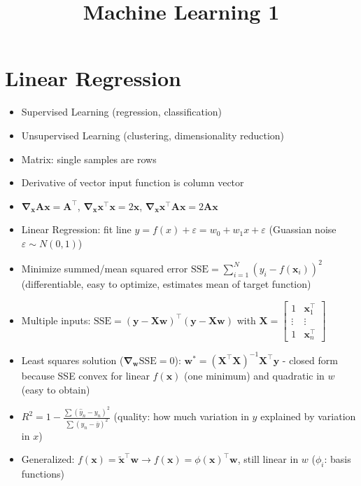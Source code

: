 \documentclass[11pt]{scrartcl}
\title{Machine Learning 1}
\date{\vspace{-5ex}}
\begin{document}
\maketitle

\section{Linear Regression}

\begin{itemize}
    \item Supervised Learning (regression, classification)
    \item Unsupervised Learning (clustering, dimensionality reduction)
    \item Matrix: single samples are rows
    \item Derivative of vector input function is column vector
    \item \(\bm{\nabla_x} \bm{Ax} = \bm{A}^\top\), \(\bm{\nabla_x} \bm{x}^\top \bm{x} = 2 
        \bm{x}\), \(\bm{\nabla_x} \bm{x}^\top \bm{A} \bm{x} = 2 \bm{Ax}\)
    \item Linear Regression: fit line \(y = f(x) + \varepsilon = w_0 + w_1 x + \varepsilon\) 
        (Guassian noise \(\varepsilon \sim N(0, 1)\))
    \item Minimize summed/mean squared error \(\mathrm{SSE} = 
        \sum_{i = 1}^N (y_i - f(\bm{x}_i))^2\) (differentiable, easy to optimize, 
        estimates mean of target function)
    \item Multiple inputs: \(\mathrm{SSE} = (\bm{y} - \bm{Xw})^\top (\bm{y} - \bm{Xw})\) 
        with \(\bm{X} = \begin{bmatrix}
            1 & \bm{x}_1^\top\\
            \vdots & \vdots\\
            1 & \bm{x}_n^\top
        \end{bmatrix}\)
    \item Least squares solution (\(\bm{\nabla_w} \mathrm{SSE} = 0\)): \(\bm{w}^* = 
        (\bm{X}^\top \bm{X})^{-1} \bm{X}^\top \bm{y}\) - closed form because SSE convex for 
        linear \(f(\bm{x})\) (one minimum) and quadratic in \(w\) (easy to obtain)
    \item \(R^2 = 1 - \frac{\sum (\hat{y}_n - y_n)^2}{\sum (y_n - \overline{y})^2}\) 
        (quality: how much variation in \(y\) explained by variation in \(x\))
    \item Generalized: \(f(\bm{x}) = \bm{\tilde{x}}^\top \bm{w} \rightarrow f(\bm{x}) = 
        \phi (\bm{x})^\top \bm{w}\), still linear in \(w\) (\(\phi_i\): basis functions)

\end{itemize}
\end{document}
